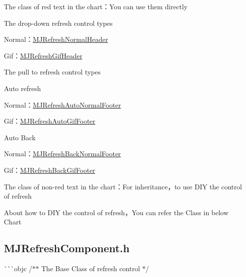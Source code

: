 \begin{DoxyItemize}
\item {\ttfamily The class of red text} in the chart：\+You can use them directly
\begin{DoxyItemize}
\item The drop-\/down refresh control types
\begin{DoxyItemize}
\item Normal：{\ttfamily \mbox{\hyperlink{interface_m_j_refresh_normal_header}{M\+J\+Refresh\+Normal\+Header}}}
\item Gif：{\ttfamily \mbox{\hyperlink{interface_m_j_refresh_gif_header}{M\+J\+Refresh\+Gif\+Header}}}
\end{DoxyItemize}
\item The pull to refresh control types
\begin{DoxyItemize}
\item Auto refresh
\begin{DoxyItemize}
\item Normal：{\ttfamily \mbox{\hyperlink{interface_m_j_refresh_auto_normal_footer}{M\+J\+Refresh\+Auto\+Normal\+Footer}}}
\item Gif：{\ttfamily \mbox{\hyperlink{interface_m_j_refresh_auto_gif_footer}{M\+J\+Refresh\+Auto\+Gif\+Footer}}}
\end{DoxyItemize}
\item Auto Back
\begin{DoxyItemize}
\item Normal：{\ttfamily \mbox{\hyperlink{interface_m_j_refresh_back_normal_footer}{M\+J\+Refresh\+Back\+Normal\+Footer}}}
\item Gif：{\ttfamily \mbox{\hyperlink{interface_m_j_refresh_back_gif_footer}{M\+J\+Refresh\+Back\+Gif\+Footer}}}
\end{DoxyItemize}
\end{DoxyItemize}
\end{DoxyItemize}
\item {\ttfamily The class of non-\/red text} in the chart：\+For inheritance，to use D\+IY the control of refresh
\item About how to D\+IY the control of refresh，\+You can refer the Class in below Chart~\newline
 
\end{DoxyItemize}

\subsection*{M\+J\+Refresh\+Component.\+h}

\`{}\`{}\`{}objc /$\ast$$\ast$ The Base Class of refresh control $\ast$/ 